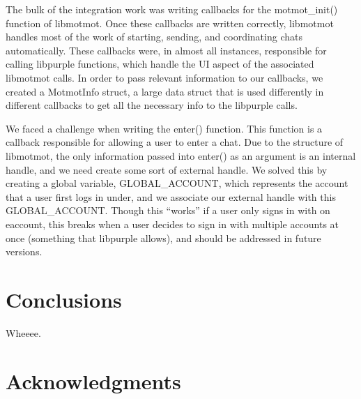 \documentclass{sig-alternate}
\begin{document}
The bulk of the integration work was writing callbacks for the motmot\_init() function of libmotmot.  Once these callbacks are written correctly, libmotmot handles most of the work of starting, sending, and coordinating chats automatically.  These callbacks were, in almost all instances, responsible for calling libpurple functions, which handle the UI aspect of the associated libmotmot calls.  In order to pass relevant information to our callbacks, we created a MotmotInfo struct, a large data struct that is used differently in different callbacks to get all the necessary info to the libpurple calls.

We faced a challenge when writing the enter() function.  This function is a callback responsible for allowing a user to enter a chat.  Due to the structure of libmotmot, the only information passed into enter() as an argument is an internal handle, and we need create some sort of external handle.  We solved this by creating a global variable, GLOBAL\_ACCOUNT, which represents the account that a user first logs in under, and we associate our external handle with this GLOBAL\_ACCOUNT.  Though this ``works'' if a user only signs in with on eaccount, this breaks when a user decides to sign in with multiple accounts at once (something that libpurple allows), and should be addressed in future versions.

\section{Conclusions}

Wheeee.

\section{Acknowledgments}

\end{document}
